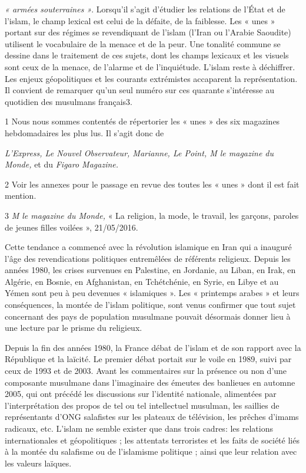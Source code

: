 \emph{« armées souterraines »}. Lorsqu'il s'agit d'étudier les relations
de l'État et de l'islam, le champ lexical est celui de la défaite, de la
faiblesse. Les « unes » portant sur des régimes se revendiquant de
l'islam (l'Iran ou l'Arabie Saoudite) utilisent le vocabulaire de la
menace et de la peur. Une tonalité commune se dessine dans le traitement
de ces sujets, dont les champs lexicaux et les visuels sont ceux de la
menace, de l'alarme et de l'inquiétude. L'islam reste à déchiffrer. Les
enjeux géopolitiques et les courants extrémistes accaparent la
représentation. Il convient de remarquer qu'un seul numéro sur ces
quarante s'intéresse au quotidien des musulmans français3.

1 Nous nous sommes contentés de répertorier les « unes » des six
magazines hebdomadaires les plus lus. Il s'agit donc de

\emph{L'Express, Le Nouvel Observateur, Marianne, Le Point, M le
magazine du Monde,} et du \emph{Figaro Magazine.}

2 Voir les annexes pour le passage en revue des toutes les « unes » dont
il est fait mention.

3 \emph{M le magazine du Monde,} « La religion, la mode, le travail, les
garçons, paroles de jeunes filles voilées », 21/05/2016.



Cette tendance a commencé avec la révolution islamique en Iran qui a
inauguré l'âge des revendications politiques entremêlées de référents
religieux. Depuis les années 1980, les crises survenues en Palestine, en
Jordanie, au Liban, en Irak, en Algérie, en Bosnie, en Afghanistan, en
Tchétchénie, en Syrie, en Libye et au Yémen sont peu à peu devenues «
islamiques ». Les « printemps arabes » et leurs conséquences, la montée
de l'islam politique, sont venus confirmer que tout sujet concernant des
pays de population musulmane pouvait désormais donner lieu à une lecture
par le prisme du religieux.

Depuis la fin des années 1980, la France débat de l'islam et de son
rapport avec la République et la laïcité. Le premier débat portait sur
le voile en 1989, suivi par ceux de 1993 et de 2003. Avant les
commentaires sur la présence ou non d'une composante musulmane dans
l'imaginaire des émeutes des banlieues en automne 2005, qui ont précédé
les discussions sur l'identité nationale, alimentées par
l'interprétation des propos de tel ou tel intellectuel musulman, les
saillies de représentants d'ONG salafistes sur les plateaux de
télévision, les prêches d'imams radicaux, etc. L'islam ne semble exister
que dans trois cadres: les relations internationales et géopolitiques ;
les attentats terroristes et les faits de société liés à la montée du
salafisme ou de l'islamisme politique ; ainsi que leur relation avec les
valeurs laïques.

